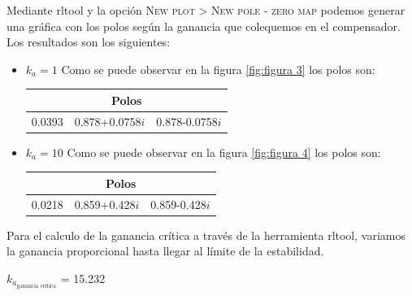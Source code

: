 Mediante rltool y la opción \textsc{New plot > New pole - zero map} podemos
generar una gráfica con los polos según la ganancia que colequemos en
el compensador. Los resultados son los siguientes:

\begin{itemize}
\item $k_a = 1$
  Como se puede observar en la figura \ref{fig:figura 3} los polos son:
  \begin{center}
    \begin{tabular}{ |c|c|c| } 
      \hline
      \multicolumn{3}{|c|}{Polos}\\
      \hline
      0.0393 & 0.878+0.0758$i$ & 0.878-0.0758$i$\\
      \hline
    \end{tabular}
  \end{center}
\item $k_a = 10$
  Como se puede observar en la figura \ref{fig:figura 4} los polos son:
  \begin{center}
    \begin{tabular}{ |c|c|c| } 
      \hline
      \multicolumn{3}{|c|}{Polos}\\
      \hline
      0.0218 & 0.859+0.428$i$ & 0.859-0.428$i$\\
      \hline
    \end{tabular}
\end{center}
\end{itemize}


Para el calculo de la ganancia crítica a través de la herramienta
rltool, variamos la ganancia proporcional hasta llegar al límite de la
estabilidad. 
\begin{center}
$k_{a_{\text{ganancia crítica}}}$  = 15.232
\end{center}



